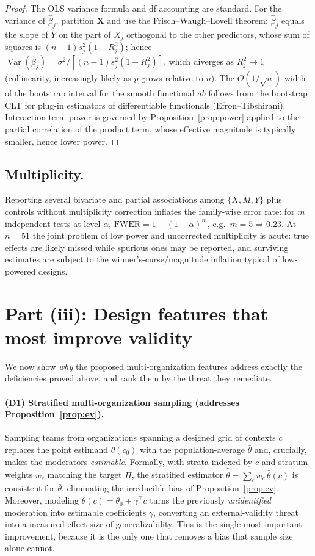 \documentclass{amsart}
\theoremstyle{definition}
\begin{document}
\begin{proof}
The OLS variance formula and df accounting are standard. For the variance of
$\hat\beta_j$, partition $\mathbf X$ and use the Frisch--Waugh--Lovell
theorem: $\hat\beta_j$ equals the slope of $Y$ on the part of $X_j$ orthogonal
to the other predictors, whose sum of squares is $(n-1)s_j^2(1-R_j^2)$;
hence $\operatorname{Var}(\hat\beta_j)=\sigma^2/[(n-1)s_j^2(1-R_j^2)]$, which
diverges as $R_j^2\to1$ (collinearity, increasingly likely as $p$ grows
relative to $n$). The $O(1/\sqrt n)$ width of the bootstrap interval for the
smooth functional $ab$ follows from the bootstrap CLT for plug-in estimators
of differentiable functionals (Efron--Tibshirani). Interaction-term power is
governed by Proposition~\ref{prop:power} applied to the partial correlation
of the product term, whose effective magnitude is typically smaller, hence
lower power.
\end{proof}

\subsection*{Multiplicity.}
Reporting several bivariate and partial associations among $\{X,M,Y\}$ plus
controls without multiplicity correction inflates the family-wise error rate:
for $m$ independent tests at level $\alpha$, $\mathrm{FWER}=1-(1-\alpha)^m$,
e.g.\ $m=5\Rightarrow 0.23$. At $n=51$ the joint problem of low power and
uncorrected multiplicity is acute: true effects are likely missed while
spurious ones may be reported, and surviving estimates are subject to the
winner's-curse/magnitude inflation typical of low-powered designs.

\section*{Part (iii): Design features that most improve validity}

We now show \emph{why} the proposed multi-organization features address
exactly the deficiencies proved above, and rank them by the threat they
remediate.

\paragraph{(D1) Stratified multi-organization sampling (addresses
Proposition~\ref{prop:ev}).}
Sampling teams from organizations spanning a designed grid of contexts
$c$ replaces the point estimand $\theta(c_0)$ with the population-average
$\bar\theta$ and, crucially, makes the moderators \emph{estimable}.
Formally, with strata indexed by $c$ and stratum weights $w_c$ matching the
target $\Pi$, the stratified estimator
$\widehat{\bar\theta}=\sum_c w_c\,\widehat\theta(c)$ is consistent for
$\bar\theta$, eliminating the irreducible bias of
Proposition~\ref{prop:ev}. Moreover, modeling $\theta(c)=\theta_0+\gamma^\top c$
turns the previously \emph{unidentified} moderation into estimable
coefficients $\gamma$, converting an external-validity threat into a
measured effect-size of generalizability. This is the single most important
improvement, because it is the only one that removes a bias that sample size
alone cannot.
\end{document}
